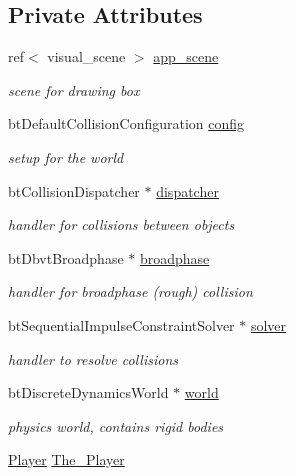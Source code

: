 \subsection*{Private Attributes}
\begin{DoxyCompactItemize}
\item 
ref$<$ visual\+\_\+scene $>$ \hyperlink{classoctet_1_1minecraft__wars_ac96956a574d5aa5a30a84de7e226bd34}{app\+\_\+scene}
\begin{DoxyCompactList}\small\item\em scene for drawing box \end{DoxyCompactList}\item 
bt\+Default\+Collision\+Configuration \hyperlink{classoctet_1_1minecraft__wars_a0c7e9c9bea5aa8288253f9617d02967c}{config}
\begin{DoxyCompactList}\small\item\em setup for the world \end{DoxyCompactList}\item 
bt\+Collision\+Dispatcher $\ast$ \hyperlink{classoctet_1_1minecraft__wars_aeff7b8c9d268bc27c1dcf5ddac645cc9}{dispatcher}
\begin{DoxyCompactList}\small\item\em handler for collisions between objects \end{DoxyCompactList}\item 
bt\+Dbvt\+Broadphase $\ast$ \hyperlink{classoctet_1_1minecraft__wars_a3f2bdb1f69ade79860ca22618cef0040}{broadphase}
\begin{DoxyCompactList}\small\item\em handler for broadphase (rough) collision \end{DoxyCompactList}\item 
bt\+Sequential\+Impulse\+Constraint\+Solver $\ast$ \hyperlink{classoctet_1_1minecraft__wars_adbb4181c0f1c875551b55294cb6e3fca}{solver}
\begin{DoxyCompactList}\small\item\em handler to resolve collisions \end{DoxyCompactList}\item 
bt\+Discrete\+Dynamics\+World $\ast$ \hyperlink{classoctet_1_1minecraft__wars_ad609d762782c6f823aec20fc26dfae00}{world}
\begin{DoxyCompactList}\small\item\em physics world, contains rigid bodies \end{DoxyCompactList}\item 
\hyperlink{structoctet_1_1_player}{Player} \hyperlink{classoctet_1_1minecraft__wars_a645d3de2d70d3db06ca3762d75e5218c}{The\+\_\+\+Player}

\end{DoxyCompactItemize}
